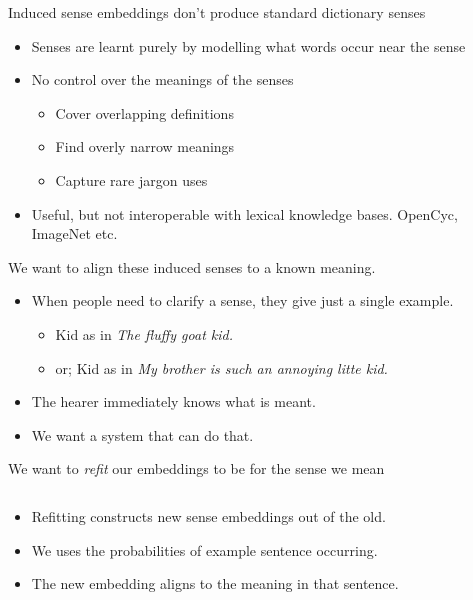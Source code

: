 \documentclass[dvipsnames]{beamer}
\newcommand{\fitcolumn}[1]{
	\begin{column}{0.5\textwidth}
		\begin{adjustbox}{max width=\columnwidth}
			#1
		\end{adjustbox}
	\end{column}%
}
\newcommand{\inputcolumn}[1]{%
	\fitcolumn{}
}
\begin{document}
\begin{frame}{Induced sense embeddings don't produce standard dictionary senses}
	 \begin{itemize}
	 	\item<1-> Senses are learnt \alert{purely by modelling} what words occur near the sense
	 	\item<2-> \alert{No control} over the meanings of the senses \begin{itemize}
	 		\item Cover \alert{overlapping} definitions
	 		\item Find overly \alert{narrow} meanings
	 		\item Capture rare \alert{jargon} uses
	 	\end{itemize}
		\item<3-> Useful, but \alert{not interoperable} with lexical knowledge bases. OpenCyc, ImageNet etc.	
	 \end{itemize}
\end{frame}

\begin{frame}{We want to align these induced senses to a known meaning.}
 \begin{itemize}
 	\item When people need to clarify a sense, they give just a \alert{single example}.
 	\begin{itemize}
 		\item Kid as in \emph{The fluffy goat kid.}
 		\item or; Kid as in \emph{My brother is such an annoying litte kid.}
 	\end{itemize}
	 \item The hearer immediately knows what is meant.
	 \item We want a system that can do that.
 \end{itemize}	
\end{frame}


\begin{frame}[label=refittingslide]{We want to \emph{refit}  our embeddings to be for the sense we mean}
	\begin{columns}[T]
		\begin{column}{0.5\textwidth}
			\begin{itemize}
				\item \alert{Refitting} constructs new sense embeddings out of the old.
				\item We uses the \alert{probabilities} of example sentence occurring.
				\item The new embedding aligns to the meaning in \alert{that sentence}.
			\end{itemize}			
		\end{column}
		
		\inputcolumn{../figs/refitting.tex}
	\end{columns}
\end{frame}
\end{document}
